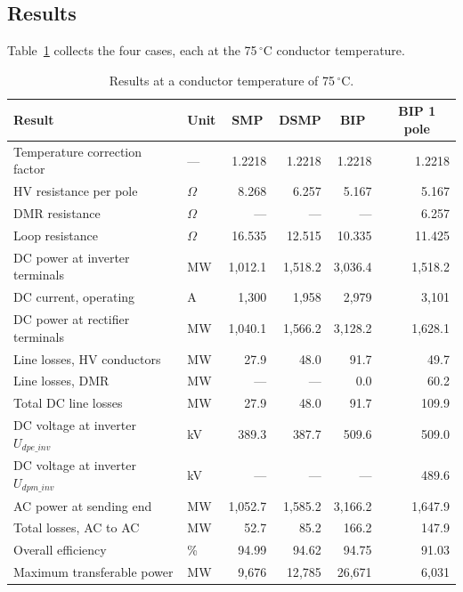 \subsection{Results}
Table~\ref{tab:refresults} collects the four cases, each at the
75\,$^{\circ}$C conductor temperature.

\begin{table}[!ht]
  \centering
  \small
  \renewcommand{\arraystretch}{1.25}
  \begin{tabularx}{\linewidth}{@{}X l r r r r@{}}
    \toprule
    \textbf{Result} & \multicolumn{1}{c}{\textbf{Unit}} &
    \multicolumn{1}{c}{\textbf{SMP}} & \multicolumn{1}{c}{\textbf{DSMP}} & \multicolumn{1}{c}{\textbf{BIP}} & \multicolumn{1}{c}{\textbf{BIP 1 pole}} \\
    \midrule
    Temperature correction factor    & ---      & 1.2218  & 1.2218  & 1.2218  & 1.2218  \\
    HV resistance per pole           & $\Omega$ & 8.268   & 6.257   & 5.167   & 5.167   \\
    DMR resistance                   & $\Omega$ & ---     & ---     & ---     & 6.257   \\
    Loop resistance                  & $\Omega$ & 16.535  & 12.515  & 10.335  & 11.425  \\
    DC power at inverter terminals   & MW       & 1{,}012.1 & 1{,}518.2 & 3{,}036.4 & 1{,}518.2 \\
    DC current, operating            & A        & 1{,}300 & 1{,}958 & 2{,}979 & 3{,}101 \\
    DC power at rectifier terminals  & MW       & 1{,}040.1 & 1{,}566.2 & 3{,}128.2 & 1{,}628.1 \\
    Line losses, HV conductors       & MW       & 27.9    & 48.0    & 91.7    & 49.7    \\
    Line losses, DMR                 & MW       & ---     & ---     & 0.0     & 60.2    \\
    Total DC line losses             & MW       & 27.9    & 48.0    & 91.7    & 109.9   \\
    DC voltage at inverter $U_{dpe\_inv}$ & kV    & 389.3   & 387.7   & 509.6   & 509.0   \\
    DC voltage at inverter $U_{dpm\_inv}$ & kV       & ---     & ---     & ---     & 489.6   \\
    AC power at sending end          & MW       & 1{,}052.7 & 1{,}585.2 & 3{,}166.2 & 1{,}647.9 \\
    Total losses, AC to AC           & MW       & 52.7    & 85.2    & 166.2   & 147.9   \\
    Overall efficiency               & \%       & 94.99   & 94.62   & 94.75   & 91.03   \\
    Maximum transferable power       & MW       & 9{,}676 & 12{,}785 & 26{,}671 & 6{,}031 \\
    \bottomrule
  \end{tabularx}
  \caption{Results at a conductor temperature of 75\,$^{\circ}$C.}
  \label{tab:refresults}
\end{table}

